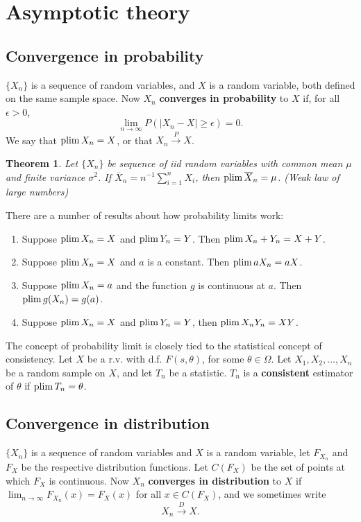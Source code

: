 \documentclass[twoside]{article}
\newtheorem{theorem}{Theorem}%
\begin{document}
\section{Asymptotic theory}\label{sec:asymptotics}

\subsection{Convergence in probability}

$\{X_n\}$ is a sequence of random variables, and $X$ is a random variable, both
defined on the same sample space. Now $X_n$ \textbf{converges in probability} to $X$
if, for all $\epsilon>0$,
\[\lim_{n\rightarrow\infty} P( |X_n-X|\geq \epsilon) = 0.\] We say that
$\operatorname{plim} X_n = X$, or that $X_n \xrightarrow{P} X$.

\begin{theorem}
Let $\{X_n\}$ be sequence of iid random variables with common mean $\mu$ and
finite variance $\sigma^2$. If $\overline{X}_n = n^{-1}\sum_{i=1}^n X_i$, then
$\operatorname{plim} \overline{X}_n=\mu$. (Weak law of large numbers)
\end{theorem}

There are a number of results about how probability limits work:
\begin{enumerate}
\item Suppose $\operatorname{plim} X_n=X$ and $\operatorname{plim} Y_n=Y$. Then $\operatorname{plim} X_n+Y_n = X+Y$.
\item Suppose $\operatorname{plim} X_n=X$ and $a$ is a constant. Then $\operatorname{plim} a X_n = aX$.
\item Suppose $\operatorname{plim} X_n=a$ and the function $g$ is continuous at $a$. Then $\operatorname{plim} g(X_n)=g(a)$.
\item Suppose $\operatorname{plim} X_n=X$ and $\operatorname{plim} Y_n=Y$, then $\operatorname{plim} X_nY_n=XY$.
\end{enumerate}

The concept of probability limit is closely tied to the statistical concept
of consistency. Let $X$ be a r.v. with d.f. $F(s,\theta)$, for some $\theta\in\Omega$.
Let $X_1,X_2,\dots,X_n$ be a random sample on $X$, and let $T_n$ be a statistic.
$T_n$ is a \textbf{consistent} estimator of $\theta$ if $\operatorname{plim} T_n = \theta$.

\subsection{Convergence in distribution}
$\{X_n\}$ is a sequence of random variables and $X$ is a random variable,
let $F_{X_n}$ and $F_X$ be the respective distribution functions. Let 
$C(F_X)$ be the set of points at which $F_X$ is continuous. Now $X_n$ \textbf{converges in
distribution} to $X$ if $\lim_{n\rightarrow\infty} F_{X_n}(x) = F_X(x)$ for all
$x\in C(F_X)$, and we sometimes write \[X_n \xrightarrow{D} X.\]
\end{document}
